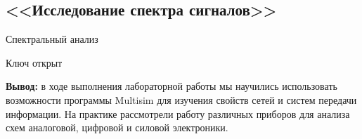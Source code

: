\documentclass[11pt]{article}
\begin{document}
\subsection{<<Исследование спектра сигналов>>}
Спектральный анализ
\begin{center}
    Ключ открыт
\end{center}
\textbf{Вывод:} в ходе выполнения лабораторной работы мы научились использовать возможности программы Multisim для изучения свойств сетей и систем передачи информации. На практике рассмотрели работу различных приборов для анализа схем аналоговой, цифровой и силовой электроники.
\end{document}
